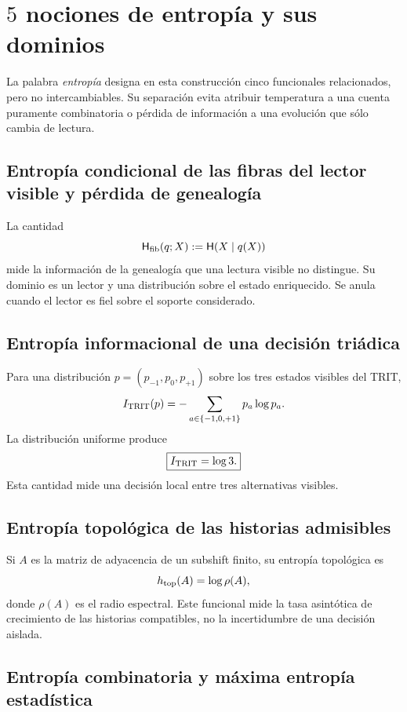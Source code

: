 \section{\(5\) nociones de entropía y sus dominios}

La palabra \emph{entropía} designa en esta construcción cinco funcionales
relacionados, pero no intercambiables. Su separación evita atribuir temperatura
a una cuenta puramente combinatoria o pérdida de información a una evolución
que sólo cambia de lectura.

\subsection{Entropía condicional de las fibras del lector visible y pérdida de genealogía}

La cantidad
\[
 \mathsf H_{\rm fib}(q;X):=\mathsf H(X\mid q(X))
\]
mide la información de la genealogía que una lectura visible no distingue.
Su dominio es un lector y una distribución sobre el estado enriquecido. Se
anula cuando el lector es fiel sobre el soporte considerado.

\subsection{Entropía informacional de una decisión triádica}

Para una distribución \(p=(p_{-1},p_0,p_{+1})\) sobre los tres estados
visibles del TRIT,
\[
 I_{\rm TRIT}(p)=-\sum_{a\in\{-1,0,+1\}}p_a\log p_a.
\]
La distribución uniforme produce
\begin{equation}
 \boxed{I_{\rm TRIT}=\log3.}
 \label{eq:informacion-trit-log3-anexo}
\end{equation}
Esta cantidad mide una decisión local entre tres alternativas visibles.

\subsection{Entropía topológica de las historias admisibles}

Si \(A\) es la matriz de adyacencia de un subshift finito, su entropía
topológica es
\[
 h_{\rm top}(A)=\log\rho(A),
\]
donde \(\rho(A)\) es el radio espectral. Este funcional mide la tasa
asintótica de crecimiento de las historias compatibles, no la incertidumbre
de una decisión aislada.

\subsection{Entropía combinatoria y máxima entropía estadística}


